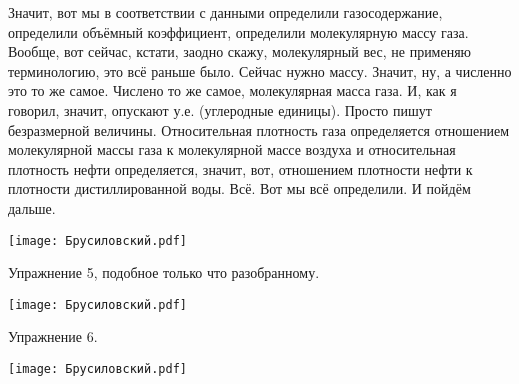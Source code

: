 \documentclass[main.tex]{subfiles}
\begin{document}
Значит, вот мы в соответствии с данными определили газосодержание, определили объёмный коэффициент, определили молекулярную массу газа.
Вообще, вот сейчас, кстати, заодно скажу, молекулярный вес, не применяю терминологию, это всё раньше было.
Сейчас нужно массу.
Значит, ну, а численно это то же самое.
Числено то же самое, молекулярная масса газа.
И, как я говорил, значит, опускают у.е. (углеродные
единицы).
Просто пишут безразмерной величины.
Относительная плотность газа определяется отношением молекулярной массы газа к молекулярной массе воздуха и относительная плотность нефти определяется, значит, вот, отношением плотности нефти к плотности дистиллированной воды.
Всё.
Вот мы всё определили.
И пойдём дальше.

\begin{center}
\texttt{[image: Брусиловский.pdf]}
\end{center}

Упражнение 5, подобное только что разобранному.

\begin{center}
\texttt{[image: Брусиловский.pdf]}
\end{center}

Упражнение 6.

\begin{center}
\texttt{[image: Брусиловский.pdf]}
\end{center}
\end{document}
